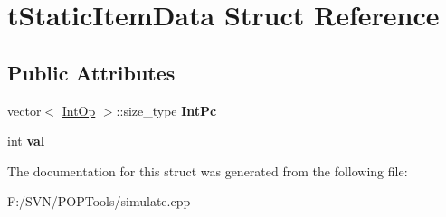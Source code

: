 \hypertarget{structt_static_item_data}{\section{t\-Static\-Item\-Data Struct Reference}
\label{structt_static_item_data}
}
\subsection*{Public Attributes}
\begin{DoxyCompactItemize}
\item 
\hypertarget{structt_static_item_data_a27ed539baf1d648df62dc7809b048f2b}{vector$<$ \hyperlink{struct_int_op_tag}{Int\-Op} $>$\-::size\-\_\-type {\bfseries Int\-Pc}}\label{structt_static_item_data_a27ed539baf1d648df62dc7809b048f2b}

\item 
\hypertarget{structt_static_item_data_a913588908946e9103ebd5ff16d3b418f}{int {\bfseries val}}\label{structt_static_item_data_a913588908946e9103ebd5ff16d3b418f}

\end{DoxyCompactItemize}


The documentation for this struct was generated from the following file\-:\begin{DoxyCompactItemize}
\item 
F\-:/\-S\-V\-N/\-P\-O\-P\-Tools/simulate.\-cpp\end{DoxyCompactItemize}
